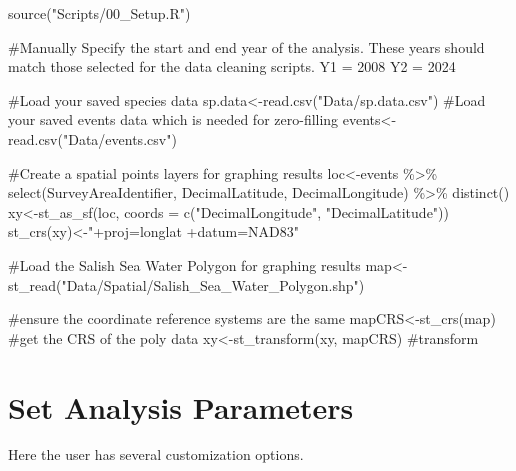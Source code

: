 \documentclass[
  letterpaper,
  DIV=11,
  numbers=noendperiod]{scrreprt}
\newenvironment{Shaded}{\begin{snugshade}}{\end{snugshade}}
\newcommand{\AttributeTok}[1]{\textcolor[rgb]{0.40,0.45,0.13}{#1}}
\newcommand{\CommentTok}[1]{\textcolor[rgb]{0.37,0.37,0.37}{#1}}
\newcommand{\DecValTok}[1]{\textcolor[rgb]{0.68,0.00,0.00}{#1}}
\newcommand{\FunctionTok}[1]{\textcolor[rgb]{0.28,0.35,0.67}{#1}}
\newcommand{\NormalTok}[1]{\textcolor[rgb]{0.00,0.23,0.31}{#1}}
\newcommand{\OtherTok}[1]{\textcolor[rgb]{0.00,0.23,0.31}{#1}}
\newcommand{\SpecialCharTok}[1]{\textcolor[rgb]{0.37,0.37,0.37}{#1}}
\newcommand{\StringTok}[1]{\textcolor[rgb]{0.13,0.47,0.30}{#1}}
\begin{document}
\begin{Shaded}
\begin{Highlighting}[]
\FunctionTok{source}\NormalTok{(}\StringTok{"Scripts/00\_Setup.R"}\NormalTok{)}

\CommentTok{\#Manually Specify the start and end year of the analysis. These years should match those selected for the data cleaning scripts. }
\NormalTok{Y1 }\OtherTok{=} \DecValTok{2008}
\NormalTok{Y2 }\OtherTok{=} \DecValTok{2024}

\CommentTok{\#Load your saved species data }
\NormalTok{sp.data}\OtherTok{\textless{}{-}}\FunctionTok{read.csv}\NormalTok{(}\StringTok{"Data/sp.data.csv"}\NormalTok{)}
\CommentTok{\#Load your saved events data which is needed for zero{-}filling}
\NormalTok{events}\OtherTok{\textless{}{-}}\FunctionTok{read.csv}\NormalTok{(}\StringTok{"Data/events.csv"}\NormalTok{)}

\CommentTok{\#Create a spatial points layers for graphing results}
\NormalTok{loc}\OtherTok{\textless{}{-}}\NormalTok{events }\SpecialCharTok{\%\textgreater{}\%} \FunctionTok{select}\NormalTok{(SurveyAreaIdentifier, DecimalLatitude, DecimalLongitude) }\SpecialCharTok{\%\textgreater{}\%} \FunctionTok{distinct}\NormalTok{()}
\NormalTok{xy}\OtherTok{\textless{}{-}}\FunctionTok{st\_as\_sf}\NormalTok{(loc, }\AttributeTok{coords =} \FunctionTok{c}\NormalTok{(}\StringTok{"DecimalLongitude"}\NormalTok{, }\StringTok{"DecimalLatitude"}\NormalTok{))}
\FunctionTok{st\_crs}\NormalTok{(xy)}\OtherTok{\textless{}{-}}\StringTok{"+proj=longlat +datum=NAD83"}

\CommentTok{\#Load the Salish Sea Water Polygon for graphing results }
\NormalTok{map}\OtherTok{\textless{}{-}} \FunctionTok{st\_read}\NormalTok{(}\StringTok{"Data/Spatial/Salish\_Sea\_Water\_Polygon.shp"}\NormalTok{)}

\CommentTok{\#ensure the coordinate reference systems are the same}
\NormalTok{mapCRS}\OtherTok{\textless{}{-}}\FunctionTok{st\_crs}\NormalTok{(map) }\CommentTok{\#get the CRS of the poly data}
\NormalTok{xy}\OtherTok{\textless{}{-}}\FunctionTok{st\_transform}\NormalTok{(xy, mapCRS) }\CommentTok{\#transform }
\end{Highlighting}
\end{Shaded}

\section{Set Analysis Parameters}\label{3.1Analysis}

Here the user has several customization options.
\end{document}
